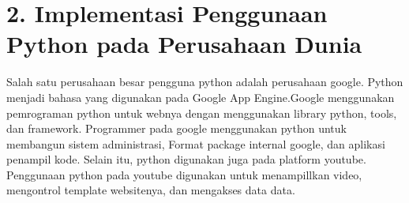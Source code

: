 \section*{\normalsize 2. Implementasi Penggunaan Python pada Perusahaan Dunia}
\hspace {\parindent} Salah satu perusahaan besar pengguna python adalah perusahaan google. Python menjadi bahasa yang digunakan pada Google App Engine.Google menggunakan pemrograman python untuk webnya dengan menggunakan library python, tools, dan framework. Programmer pada google menggunakan python untuk membangun sistem administrasi, Format package internal google, dan aplikasi penampil kode. Selain itu, python digunakan juga pada platform youtube. Penggunaan python pada youtube digunakan untuk menampillkan video, mengontrol template websitenya, dan mengakses data data. 


